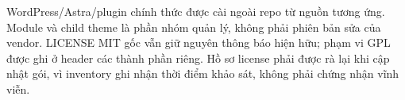 

WordPress/Astra/plugin chính thức được cài ngoài repo từ nguồn tương ứng. Module  và child theme là phần nhóm quản lý, không phải phiên bản sửa của vendor. LICENSE MIT gốc vẫn giữ nguyên thông báo hiện hữu; phạm vi GPL được ghi ở header các thành phần riêng. Hồ sơ license phải được rà lại khi cập nhật gói, vì inventory ghi nhận thời điểm khảo sát, không phải chứng nhận vĩnh viễn.
